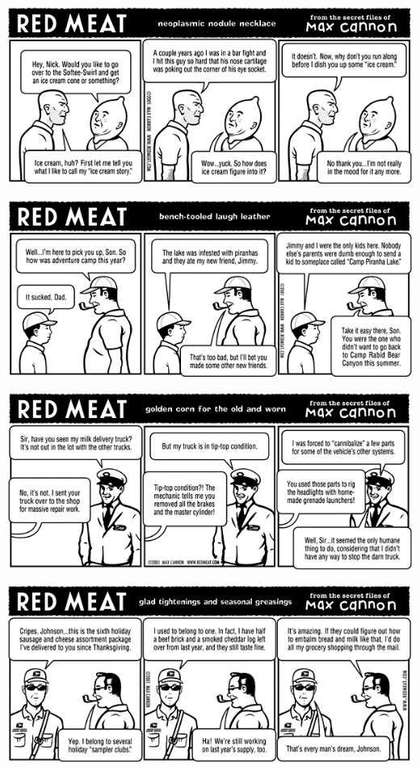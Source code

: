 \documentclass[a4paper,twoside,11pt]{article}
\begin{document}
\includegraphics[width=\textwidth]{redmeat_2001-11-27.png}



\includegraphics[width=\textwidth]{redmeat_2001-12-04.png}



\includegraphics[width=\textwidth]{redmeat_2001-12-11.png}



\includegraphics[width=\textwidth]{redmeat_2001-12-18.png}
\end{document}
